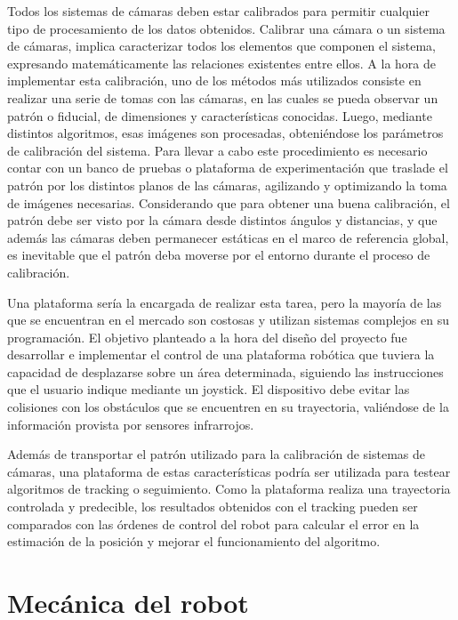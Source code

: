 \documentclass[conference,a4paper,9pt]{IEEEtran}
\begin{document}
Todos los sistemas de cámaras deben estar calibrados para permitir cualquier tipo de procesamiento de los datos obtenidos. Calibrar una cámara o un sistema de cámaras, implica caracterizar todos los elementos que componen el sistema, expresando matemáticamente las relaciones existentes entre ellos. A la hora de implementar esta calibración, uno de los métodos más utilizados consiste en realizar una serie de tomas con las cámaras, en las cuales se pueda observar un patrón o fiducial, de dimensiones y características conocidas. Luego, mediante distintos algoritmos, esas imágenes son procesadas, obteniéndose los parámetros de calibración del sistema. Para llevar a cabo este procedimiento es necesario contar con un banco de pruebas o plataforma de experimentación que traslade el patrón por los distintos planos de las cámaras, agilizando y optimizando la toma de imágenes necesarias. Considerando que para obtener una buena calibración, el patrón debe ser visto por la cámara desde distintos ángulos y distancias, y que además las cámaras deben permanecer estáticas en el marco de referencia global, es inevitable que el patrón deba moverse por el entorno durante el proceso de calibración.

Una plataforma sería la encargada de realizar esta tarea, pero la mayoría de las que se encuentran en el mercado son costosas y utilizan sistemas complejos en su programación. El objetivo planteado a la hora del diseño del proyecto fue desarrollar e implementar el control de una plataforma robótica que tuviera la capacidad de desplazarse sobre un área determinada, siguiendo las instrucciones que el usuario indique mediante un joystick. El dispositivo debe evitar las colisiones con los obstáculos que se encuentren en su trayectoria, valiéndose de la información provista por sensores infrarrojos.

Además de transportar el patrón utilizado para la calibración de sistemas de cámaras, una plataforma de estas características podría ser utilizada para testear algoritmos de tracking o seguimiento. Como la plataforma realiza una trayectoria controlada y predecible, los resultados obtenidos con el tracking pueden ser comparados con las órdenes de control del robot para calcular el error en la estimación de la posición y mejorar el funcionamiento del algoritmo.

\section{Mecánica del robot}
\end{document}
